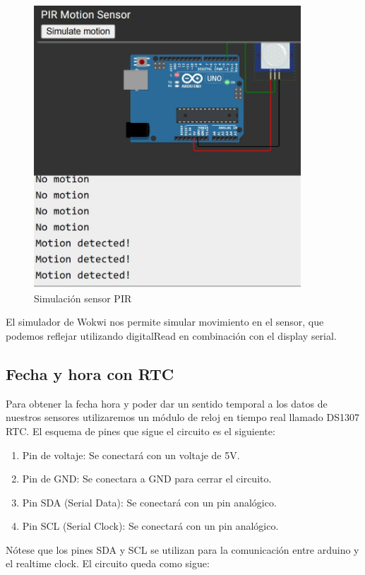 \begin{figure}[H]
    \centering
    \includegraphics[width = 10cm]{ImagenesLatex/pir_simulation.JPG}{}
    \caption{Simulación sensor PIR}
\end{figure}

El simulador de Wokwi nos permite simular movimiento en el sensor, que podemos reflejar utilizando digitalRead en combinación con el display serial.

\subsection{Fecha y hora con RTC}
Para obtener la fecha hora y poder dar un sentido temporal a los datos de nuestros sensores utilizaremos un módulo de reloj en tiempo real llamado DS1307 RTC. El esquema de pines que sigue el circuito es el siguiente:
\begin{enumerate}
    \item Pin de voltaje: Se conectará con un voltaje de 5V.
    \item Pin de GND: Se conectara a GND para cerrar el circuito.
    \item Pin SDA (Serial Data): Se conectará con un pin analógico.
    \item Pin SCL (Serial Clock): Se conectará con un pin analógico. 
\end{enumerate}
Nótese que los pines SDA y SCL se utilizan para la comunicación entre arduino y el realtime clock. El circuito queda como sigue:

